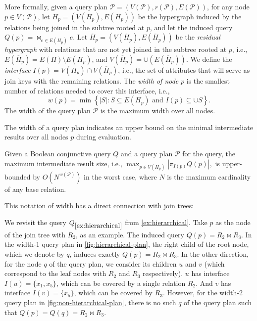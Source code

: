 More formally, given a query plan $\mathcal{P} = (V(\mathcal{P}), r(\mathcal{P}), E(\mathcal{P}))$, for any node $p \in V(\mathcal{P})$, let $H_p = (V(H_p), E(H_p))$ be the hypergraph induced by the relations being joined in the subtree rooted at $p$, and let the induced query $Q(p) = \mathop{\Join}_{e \in E(H_p)} e$. Let $\overline H_p = (V(\overline H_p), E(\overline H_p))$ be the \emph{residual hypergraph} with relations that are not yet joined in the subtree rooted at $p$, i.e., $E(\overline H_p) = E(H) \setminus E(H_p)$, and $V(\overline H_p) = \cup(E(\overline H_p))$.  We define the \emph{interface} $I(p) = V(H_p) \cap V(\overline H_p)$, i.e., the set of attributes that will serve as join keys with the remaining relations. 
The \emph{width of node} $p$ is the smallest number of relations needed to cover this interface, i.e.,
\[
    w(p) = \min \left\{ |S| : S \subseteq E(H_p) \text{ and } I(p) \subseteq \cup S \right\}.
\]
The width of the query plan $\mathcal{P}$ is the maximum width over all nodes.

The width of a query plan indicates an upper bound on the minimal intermediate results over all nodes $p$ during evaluation.

\begin{theorem} \label{thm:w1plan-size-bound}
Given a Boolean conjunctive query $Q$ and a query plan $\mathcal{P}$ for the query, the maximum intermediate result size, i.e.,
    $\max_{p \in V(H_p)} |\pi_{I(p)} Q(p)|,$
is upper-bounded by $O(N^{w(\mathcal{P})})$ in the worst case, where $N$ is the maximum cardinality of any base relation.
\end{theorem}

This notation of width has a direct connection with join trees: %

\begin{example}
    We revisit the query $Q_{\ref{ex:hierarchical}}$ from \cref{ex:hierarchical}.
    Take $p$ as the node of the join tree with $R_2$, as an example. The induced query $Q(p) = R_2 \bowtie R_3$. In the width-1 query plan in \cref{fig:hierarchical-plan}, the right child of the root node, which we denote by $q$, induces exactly $Q(p) = R_2 \bowtie R_3$.
    In the other direction, for the node $q$ of the query plan, we consider its children $u$ and $v$ (which correspond to the leaf nodes with $R_2$ and $R_3$ respectively). $u$ has interface $I(u) = \{ x_1, x_5 \}$, which can be covered by a single relation $R_2$. And $v$ has interface $I(v) = \{ x_5 \}$, which can be covered by $R_3$.
    However, for the width-2 query plan in \cref{fig:non-hierarchical-plan}, there is no such $q$ of the query plan such that $Q(p) = Q(q) = R_2 \bowtie R_3$.
\end{example}

